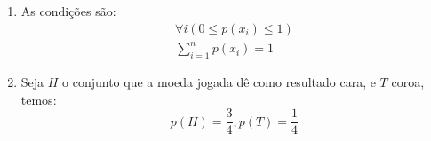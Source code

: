 \item
\begin{enumerate}
  \item As condições são:
  \[\begin{array}{l}
\forall i\left( {0 \le p({x_i}) \le 1} \right)\\
\sum\nolimits_{i = 1}^n {p({x_i})}  = 1
\end{array}\]
  \item Seja $H$ o conjunto que a moeda jogada dê como resultado cara, e $T$ coroa, temos:
  \[p(H) = \frac{3}{4},p(T) = \frac{1}{4}\]
\end{enumerate}
